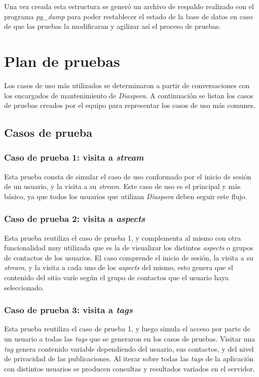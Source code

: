 Una vez creada esta estructura se generó un archivo de respaldo realizado con el programa \emph{pg\_dump} para poder restablecer el estado de la base de datos en caso
de que las pruebas la modificaran y agilizar así el proceso de pruebas.

\section{Plan de pruebas}
\label{cap7:plan}

Los casos de uso más utilizados se determinaron a partir de conversaciones con los encargados de mantenimiento de \emph{Diaspora}. A continuación se listan los casos de
pruebas creados por el equipo para representar los casos de uso más comunes.

\subsection{Casos de prueba}

\subsubsection{Caso de prueba 1: visita a \emph{stream}}

Esta prueba consta de simular el caso de uso conformado por el inicio de sesión de un usuario, y la visita a su \emph{stream}. Este caso de uso es el principal y más básico, ya que 
todos los usuarios que utilizan \emph{Diaspora} deben seguir este flujo.

\subsubsection{Caso de prueba 2: visita a \emph{aspects}}

Esta prueba reutiliza el caso de prueba 1, y complementa al mismo con otra funcionalidad muy utilizada que es la de visualizar los distintos \emph{aspects} o grupos de contactos
de los usuarios. El caso comprende el inicio de sesión, la visita a su \emph{stream}, y la visita a cada uno de los \emph{aspects} del mismo, esto genera que el
contenido del sitio varíe según el grupo de contactos que el usuario haya seleccionado.

\subsubsection{Caso de prueba 3: visita a \emph{tags}}

Esta prueba reutiliza el caso de prueba 1, y luego simula el acceso por parte de un usuario a todas las \emph{tags} que se generaron en los casos de pruebas. Visitar una
\emph{tag} genera contenido variable dependiendo del usuario, sus contactos, y del nivel de privacidad de las publicaciones. Al iterar sobre todas las \emph{tags} de la
aplicación con distintos usuarios se producen consultas y resultados variados en el servidor.

